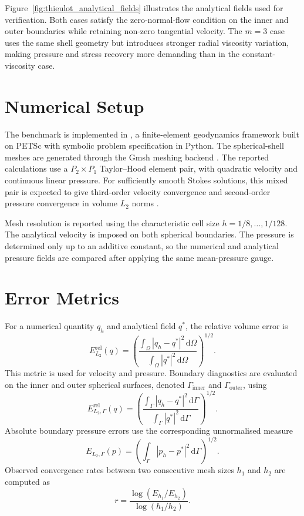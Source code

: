 \documentclass[gmd, manuscript]{copernicus}
\begin{document}
Figure~\ref{fig:thieulot_analytical_fields} illustrates the analytical fields
used for verification. Both cases satisfy the zero-normal-flow condition on the
inner and outer boundaries while retaining non-zero tangential velocity. The
\(m=3\) case uses the same shell geometry but introduces stronger radial
viscosity variation, making pressure and stress recovery more demanding than in
the constant-viscosity case.

\section{Numerical Setup}

The benchmark is implemented in , a finite-element
geodynamics framework built on PETSc \citep{osti_2337606} with symbolic problem
specification in Python. The spherical-shell meshes are generated through the
Gmsh meshing backend \citep{Geuzaine2009}. The reported calculations use a
\(P_2\times P_1\) Taylor--Hood element pair, with quadratic velocity and
continuous linear pressure. For sufficiently smooth Stokes solutions, this
mixed pair is expected to give third-order velocity convergence and
second-order pressure convergence in volume \(L_2\) norms
\citep{girault1986,boffi2013}.

Mesh resolution is reported using the characteristic cell size
\(h=1/8,\ldots,1/128\). The analytical velocity is imposed on both spherical
boundaries. The pressure is determined only up to an additive constant, so the
numerical and analytical pressure fields are compared after applying the same
mean-pressure gauge.

\section{Error Metrics}

For a numerical quantity \(q_h\) and analytical field \(q^*\), the relative
volume error is
\begin{equation}
  E_{L_2}^{\mathrm{rel}}(q)
  =
  \left(
  \frac{\int_\Omega |q_h-q^*|^2\,\mathrm{d}\Omega}
       {\int_\Omega |q^*|^2\,\mathrm{d}\Omega}
  \right)^{1/2}.
\end{equation}
This metric is used for velocity and pressure. Boundary diagnostics are
evaluated on the inner and outer spherical surfaces, denoted
\(\Gamma_{\mathrm{inner}}\) and \(\Gamma_{\mathrm{outer}}\), using
\begin{equation}
  E_{L_2,\Gamma}^{\mathrm{rel}}(q)
  =
  \left(
  \frac{\int_\Gamma |q_h-q^*|^2\,\mathrm{d}\Gamma}
       {\int_\Gamma |q^*|^2\,\mathrm{d}\Gamma}
  \right)^{1/2}.
\end{equation}
Absolute boundary pressure errors use the corresponding unnormalised measure
\begin{equation}
  E_{L_2,\Gamma}(p)
  =
  \left(
  \int_\Gamma |p_h-p^*|^2\,\mathrm{d}\Gamma
  \right)^{1/2}.
\end{equation}
Observed convergence rates between two consecutive mesh sizes \(h_1\) and
\(h_2\) are computed as
\begin{equation}
  r
  =
  \frac{
    \log\left(E_{h_1}/E_{h_2}\right)
  }{
    \log\left(h_1/h_2\right)
  } .
\end{equation}
\end{document}
